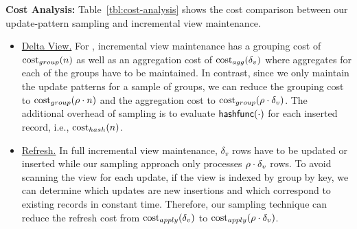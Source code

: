 \vspace{.5em}
{\noindent \bf Cost Analysis: }
 Table~\ref{tbl:cost-analysis} shows the cost comparison between our update-pattern sampling and incremental view maintenance.
\vspace{-0.5em}
\begin{itemize}
\item \underline{Delta View.} For \aggview, incremental view maintenance has a grouping cost of $\textrm{cost}_{group}(n)$ as well as an aggregation cost of $\textrm{cost}_{agg}(\delta_v)$ where aggregates for each of the groups have to be maintained. In contrast, since we only maintain the update patterns for a sample of groups, we can reduce the grouping cost to $\textrm{cost}_{group}(\rho  \cdot n)$ and the aggregation cost to $\textrm{cost}_{group}(\rho  \cdot \delta_v)$. The additional overhead of sampling is to evaluate $\textsf{hashfunc}(\cdot)$ for each inserted record, i.e., $\textrm{cost}_{hash}(n)$.  \vspace{-0.5em}
\item \underline{Refresh.} 
In full incremental view maintenance, $\delta_v$ rows have to be updated or inserted while our sampling approach only processes $\rho  \cdot \delta_v$ rows. 
To avoid scanning the view for each update, if the view is indexed by group by key, we can determine which updates are new insertions and which correspond to existing records in constant time. 
Therefore, our sampling technique can reduce the refresh cost from $\textrm{cost}_{apply}(\delta_v)$ to $\textrm{cost}_{apply}(\rho \cdot \delta_v)$.

\vspace{-0.25em}

\end{itemize}

